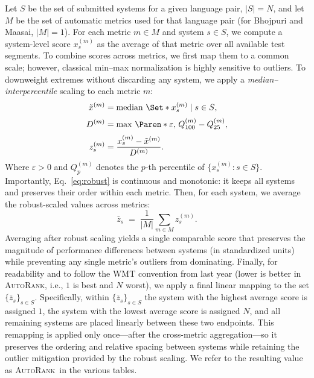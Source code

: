 \documentclass[11pt]{article}
\DeclareMathOperator*{\median}{median}
\newcommand{\Q}[2]{Q^{(#1)}_{#2}} %
\DeclarePairedDelimiter\Set\{\}{}
\DeclarePairedDelimiter\Paren()   %
\newcommand{\auto}{\textsc{AutoRank}}
\begin{document}
Let $S$ be the set of submitted systems for a given language pair, $|S|=N$, and let $M$ be the set of automatic metrics used for that language pair (for Bhojpuri and Maasai, $|M|=1$). For each metric $m\in M$ and system $s\in S$, we compute a system-level score $x^{(m)}_s$ as the average of that metric over all available test segments. To combine scores across metrics, we first map them to a common scale; however, classical min–max normalization is highly sensitive to outliers. To downweight extremes without discarding any system, we apply a \emph{median--inter\-percentile} scaling to each metric $m$:
\begin{subequations}\label{eq:robust}
\begin{align}
\tilde{x}^{(m)} &= \median\,\Set*{x^{(m)}_s \mid s \in S},\\[2pt]
D^{(m)} &= \max\,\Paren*{\varepsilon,\, \Q{m}{100} - \Q{m}{25}},\\[2pt]
z^{(m)}_s &= \frac{x^{(m)}_s - \tilde{x}^{(m)}}{D^{(m)}}.
\end{align}
\end{subequations}
Where $\varepsilon>0$ and $\Q{m}{p}$ denotes the $p$-th percentile of $\{x^{(m)}_s : s\in S\}$. Importantly, Eq.~\eqref{eq:robust} is continuous and monotonic: it keeps all systems and preserves their order within each metric. Then, for each system, we average the robust-scaled values across metrics:
\begin{equation}
    \bar{z}_s \;=\; \frac{1}{|M|}\sum_{m\in M} z^{(m)}_s .
    \label{eq:avgz}
\end{equation}
Averaging after robust scaling yields a single comparable score that preserves the magnitude of performance differences between systems (in standardized units) while preventing any single metric’s outliers from dominating. Finally, for readability and to follow the WMT convention from last year (lower is better in \auto, i.e., $1$ is best and $N$ worst), we apply a final linear mapping to the set $\{\bar{z}_s\}_{s\in S}$. Specifically, within $\{\bar{z}_s\}_{s\in S}$ the system with the highest average score is assigned $1$, the system with the lowest average score is assigned $N$, and all remaining systems are placed linearly between these two endpoints. This remapping is applied only once—after the cross-metric aggregation—so it preserves the ordering and relative spacing between systems while retaining the outlier mitigation provided by the robust scaling. We refer to the resulting value as \auto\ in the various tables.
\end{document}
